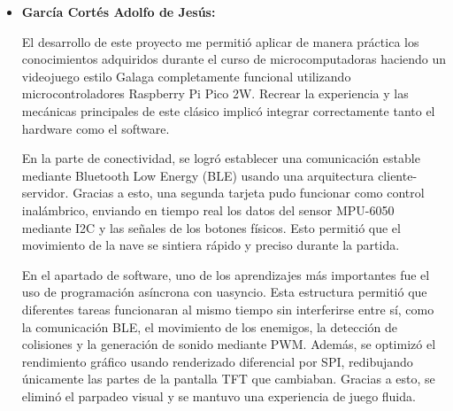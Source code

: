\documentclass[letterpaper,12pt]{article}
\begin{document}
\begin{itemize}
        En el ámbito del hardware, se validó la integración de múltiples protocolos de comunicación, donde el bus SPI permitió una tasa de refresco óptima en la pantalla TFT ILI9341 de 320x240 píxeles eliminando el parpadeo visual, el protocolo I2C aseguró una lectura precisa y de baja latencia de la unidad de medición inercial MPU-6050 para el control de la nave por la inclinación, y los módulos PWM lograron una generación acústica efectiva para Ala ambientación del juego a través del buzzer.
        
        El protocolo Bluetooth Low Energy (BLE) fue de gran ayuda para la implementación bluetooth ya que tuvo una gran estabilidad y ancho de banda, transmitiendo la telemetría del mando a una tasa constante de 100 Hz sin introducir latencias perceptibles por la naturaleza de estas teconologías.
        Por ultimo el uso de la biblioteca de programación asíncrona \texttt{uasyncio} nos ayudó a maximizar el aprovechamiento de los recursos del microcontrolador para que la consola procesara simultáneamente la física de los proyectiles, el mapeo de \textit{sprites}, la detección de colisiones complejas, los efectos de sonido y la escucha continua del puerto BLE.
 
        \item \textbf{García Cortés Adolfo de Jesús:}
        
        El desarrollo de este proyecto me permitió aplicar de manera 
        práctica los conocimientos adquiridos durante el curso de 
        microcomputadoras haciendo  un videojuego estilo Galaga 
        completamente funcional utilizando 
        microcontroladores Raspberry Pi Pico 2W. 
        Recrear la experiencia y las mecánicas 
        principales de este clásico implicó integrar correctamente 
        tanto el hardware como el software.

        En la parte de conectividad, se logró establecer una comunicación 
        estable mediante Bluetooth Low Energy (BLE) 
        usando una arquitectura cliente-servidor. 
        Gracias a esto, una segunda tarjeta pudo 
        funcionar como control inalámbrico, enviando en 
        tiempo real los datos del sensor MPU-6050 mediante I2C y 
        las señales de los botones físicos. Esto permitió 
        que el movimiento de la nave se sintiera rápido y
        preciso durante la partida.

        En el apartado de software, uno de los aprendizajes más 
        importantes fue el uso de programación asíncrona con uasyncio. 
        Esta estructura permitió que diferentes tareas 
        funcionaran al mismo tiempo sin interferirse entre sí,
        como la comunicación BLE, el movimiento de los enemigos,
        la detección de colisiones y la generación de sonido mediante PWM. 
        Además, se optimizó el rendimiento gráfico usando renderizado
        diferencial por SPI, redibujando únicamente las partes de la 
        pantalla TFT que cambiaban. Gracias a esto, se eliminó el parpadeo 
        visual y se mantuvo una experiencia de juego fluida.
        

\end{itemize}
\end{document}
